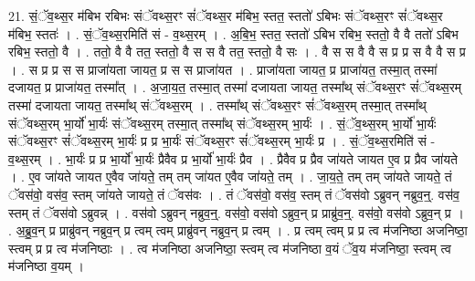 \documentclass[17pt]{extarticle}
\begin{document}
21. सं॒ॅव॒थ्स॒र म॑बिभ रबिभः संॅवथ्स॒रꣳ सं॑ॅवथ्स॒र म॑बिभ॒ स्तत॒ स्ततो॑ ऽबिभः संॅवथ्स॒रꣳ सं॑ॅवथ्स॒र म॑बिभ॒ स्ततः॑ । . सं॒ॅव॒थ्स॒रमिति॑ सं - व॒थ्स॒रम् । . अ॒बि॒भ॒ स्तत॒ स्ततो॑ ऽबिभ रबिभ॒ स्ततो॒ वै वै ततो॑ ऽबिभ रबिभ॒ स्ततो॒ वै । . ततो॒ वै वै तत॒ स्ततो॒ वै स स वै तत॒ स्ततो॒ वै सः । . वै स स वै वै स प्र प्र स वै वै स प्र । . स प्र प्र स स प्राजा॑यता जायत॒ प्र स स प्राजा॑यत । . प्राजा॑यता जायत॒ प्र प्राजा॑यत॒ तस्मा॒त् तस्मा॑ दजायत॒ प्र प्राजा॑यत॒ तस्मा᳚त् । . अ॒जा॒य॒त॒ तस्मा॒त् तस्मा॑ दजायता जायत॒ तस्मा᳚थ् संॅवथ्स॒रꣳ सं॑ॅवथ्स॒रम् तस्मा॑ दजायता जायत॒ तस्मा᳚थ् संॅवथ्स॒रम् । . तस्मा᳚थ् संॅवथ्स॒रꣳ सं॑ॅवथ्स॒रम् तस्मा॒त् तस्मा᳚थ् संॅवथ्स॒रम् भा॒र्यो॑ भा॒र्यः॑ संॅवथ्स॒रम् तस्मा॒त् तस्मा᳚थ् संॅवथ्स॒रम् भा॒र्यः॑ । . सं॒ॅव॒थ्स॒रम् भा॒र्यो॑ भा॒र्यः॑ संॅवथ्स॒रꣳ सं॑ॅवथ्स॒रम् भा॒र्यः॑ प्र प्र भा॒र्यः॑ संॅवथ्स॒रꣳ सं॑ॅवथ्स॒रम् भा॒र्यः॑ प्र । . सं॒ॅव॒थ्स॒रमिति॑ सं - व॒थ्स॒रम् । . भा॒र्यः॑ प्र प्र भा॒र्यो॑ भा॒र्यः॑ प्रैवैव प्र भा॒र्यो॑ भा॒र्यः॑ प्रैव । . प्रैवैव प्र प्रैव जा॑यते जायत ए॒व प्र प्रैव जा॑यते । . ए॒व जा॑यते जायत ए॒वैव जा॑यते॒ तम् तम् जा॑यत ए॒वैव जा॑यते॒ तम् । . जा॒य॒ते॒ तम् तम् जा॑यते जायते॒ तं ॅवस॑वो॒ वस॑व॒ स्तम् जा॑यते जायते॒ तं ॅवस॑वः । . तं ॅवस॑वो॒ वस॑व॒ स्तम् तं ॅवस॑वो ऽब्रुवन् नब्रुव॒न्॒. वस॑व॒ स्तम् तं ॅवस॑वो ऽब्रुवन्न् । . वस॑वो ऽब्रुवन् नब्रुव॒न्॒. वस॑वो॒ वस॑वो ऽब्रुव॒न् प्र प्राब्रु॑व॒न्॒. वस॑वो॒ वस॑वो ऽब्रुव॒न् प्र । . अ॒ब्रु॒व॒न् प्र प्राब्रु॑वन् नब्रुव॒न् प्र त्वम् त्वम् प्राब्रु॑वन् नब्रुव॒न् प्र त्वम् । . प्र त्वम् त्वम् प्र प्र त्व म॑जनिष्ठा अजनिष्ठा॒ स्त्वम् प्र प्र त्व म॑जनिष्ठाः । . त्व म॑जनिष्ठा अजनिष्ठा॒ स्त्वम् त्व म॑जनिष्ठा व॒यं ॅव॒य म॑जनिष्ठा॒ स्त्वम् त्व म॑जनिष्ठा व॒यम् । \newline
\end{document}
